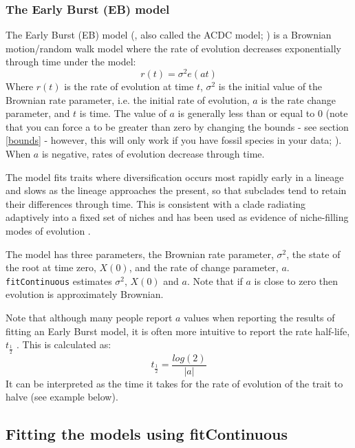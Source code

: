 \documentclass[11pt]{article}
\begin{document}
\subsubsection{The Early Burst (EB) model}

The Early Burst (EB) model (\citealt{harmon2010early}, also called the ACDC model; \citealt{blomberg2003testing}) is a Brownian motion/random walk model where the rate of evolution decreases exponentially through time under the model:
\begin{equation}
r(t) = \sigma^2e(at)
\end{equation}
Where $r(t)$ is the rate of evolution at time $t$, $\sigma^2$ is the initial value of the Brownian rate parameter, i.e. the initial rate of evolution, $a$ is the rate change parameter, and $t$ is time. The value of $a$ is generally less than or equal to 0 (note that you can force a to be greater than zero by changing the bounds - see section \ref{bounds} - however, this will only work if you have fossil species in your data; \citealt{slater2012integrating}). When $a$ is negative, rates of evolution decrease through time.

The model fits traits where diversification occurs most rapidly early in a lineage and slows as the lineage approaches the present, so that subclades tend to retain their differences through time. This is consistent with a clade radiating adaptively into a fixed set of niches and has been used as evidence of niche-filling modes of evolution \citep{harmon2010early,cooper2010body}.

The model has three parameters, the Brownian rate parameter, $\sigma^2$, the state of the root at time zero, $X(0)$, and the rate of change parameter, $a$. \texttt{fitContinuous} estimates $\sigma^2$, $X(0)$ and $a$. Note that if $a$ is close to zero then evolution is approximately Brownian.

Note that although many people report $a$ values when reporting the results of fitting an Early Burst model, it is often more intuitive to report the rate half-life, $t_{\frac{1}{2}}$ \citep{Slater22102013}. This is calculated as:
\begin{equation}
t_{\frac{1}{2}} = \frac{log(2)}{|a|}
\end{equation}
It can be interpreted as the time it takes for the rate of evolution of the trait to halve (see example below).

\subsection{Fitting the models using fitContinuous}
\end{document}
